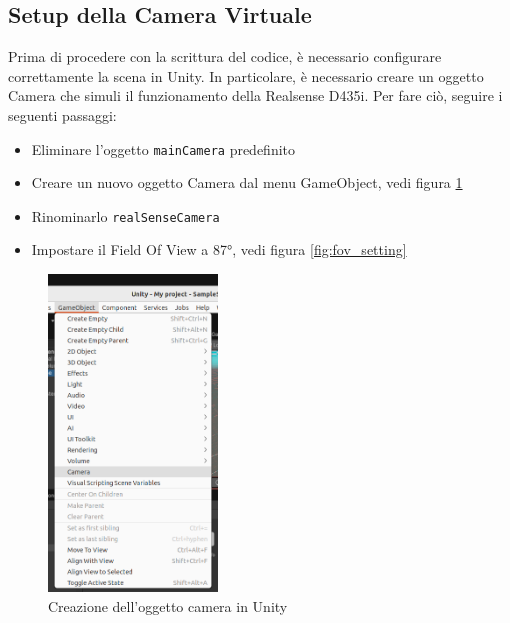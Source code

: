 \documentclass[11pt]{report}
\begin{document}
\subsection{Setup della Camera Virtuale}
Prima di procedere con la scrittura del codice, è necessario configurare correttamente la scena in Unity. In particolare, è necessario creare un oggetto Camera che simuli il funzionamento della Realsense D435i. Per fare ciò, seguire i seguenti passaggi:

\begin{itemize}
\item Eliminare l'oggetto \texttt{mainCamera} predefinito
\item Creare un nuovo oggetto Camera dal menu GameObject, vedi figura \ref{fig:create_camera}
\item Rinominarlo \texttt{realSenseCamera}
\item Impostare il Field Of View a 87°, vedi figura \ref{fig:fov_setting}
\end{itemize}

\begin{figure}[H]
    \centering
    \includegraphics[width=0.4\textwidth]{images/Immagine1.png}
    \caption{Creazione dell'oggetto camera in Unity}
    \label{fig:create_camera}
\end{figure}
\end{document}

